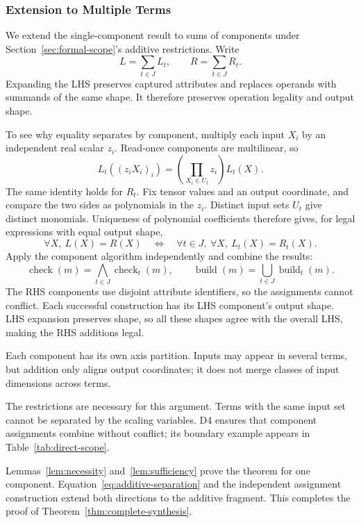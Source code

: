 \subsubsection{Extension to Multiple Terms}
\label{sec:addition-proof}
We extend the single-component result to sums of components under
Section~\ref{sec:formal-scope}'s additive restrictions. Write
\begin{equation}
 L=\sum_{t\in J}L_t,\qquad R=\sum_{t\in J}R_t.
\end{equation}
Expanding the LHS preserves captured attributes and replaces operands with
summands of the same shape. It therefore preserves operation legality and
output shape.

To see why equality separates by component, multiply each input $X_i$ by
an independent real scalar $z_i$. Read-once components are multilinear, so
\begin{equation}
 L_t((z_iX_i)_i)=\left(\prod_{X_i\in U_t}z_i\right)L_t(X).
\end{equation}
The same identity holds for $R_t$. Fix tensor values and an output
coordinate, and compare the two sides as polynomials in the $z_i$.
Distinct input sets $U_t$ give distinct monomials. Uniqueness of polynomial
coefficients therefore gives, for legal expressions with equal output shape,
\begin{equation}
 \forall X,\ L(X)=R(X)
 \quad\iff\quad
 \forall t\in J,\ \forall X,\ L_t(X)=R_t(X).
 \label{eq:additive-separation}
\end{equation}
Apply the component algorithm independently and combine the results:
\begin{equation}
 \operatorname{check}(m)=\bigwedge_{t\in J}\operatorname{check}_t(m),
 \qquad
 \operatorname{build}(m)=\bigcup_{t\in J}\operatorname{build}_t(m).
 \label{eq:additive-construction}
\end{equation}
The RHS components use disjoint attribute identifiers, so the assignments
cannot conflict. Each successful construction has its LHS component's
output shape. LHS expansion preserves shape, so all these shapes agree
with the overall LHS, making the RHS additions legal.

Each component has its own axis partition. Inputs may appear in several
terms, but addition only aligns output coordinates; it does not merge classes of input dimensions across terms.

The restrictions are necessary for this argument. Terms with the same
input set cannot be separated by the scaling variables. D4 ensures that
component assignments combine without conflict; its boundary example
appears in Table~\ref{tab:direct-scope}.

Lemmas~\ref{lem:necessity} and~\ref{lem:sufficiency} prove the theorem for
one component. Equation~\eqref{eq:additive-separation} and the independent
assignment construction extend both directions to the additive fragment.
This completes the proof of Theorem~\ref{thm:complete-synthesis}.
